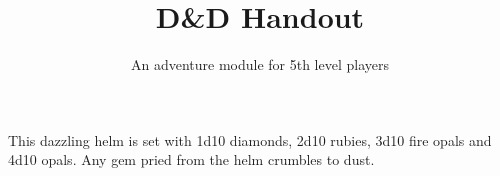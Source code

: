 \documentclass[]{rpghandout}
\title{D\&D Handout}
\subtitle{An adventure module for 5th level players}
\begin{document}
    \maketitle{}

    This dazzling helm is set with 1d10 diamonds, 2d10 rubies, 3d10 fire opals and 4d10 opals. Any gem pried from the helm crumbles to dust.

	\Blindtext{}
\end{document}
